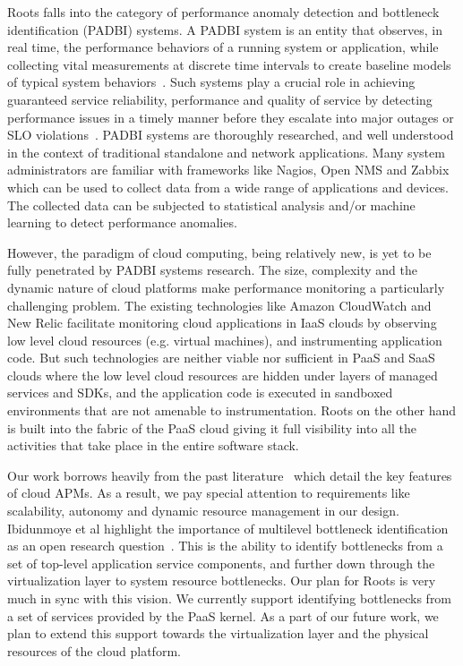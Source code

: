 Roots falls into the category of performance anomaly detection and bottleneck identification (PADBI) systems.
A PADBI system is an entity that observes, in real time, the performance behaviors
of a running system or application, while collecting vital measurements at discrete time intervals to create baseline
models of typical system behaviors~\cite{Ibidunmoye:2015:PAD:2808687.2791120}. 
Such systems play a crucial role in achieving guaranteed service reliability, performance and
quality of service by detecting performance issues in a timely manner before they escalate into major outages
or SLO violations~\cite{6045942}. 
PADBI systems are thoroughly researched, and well understood in the context of traditional standalone and
network applications. Many system administrators are familiar with frameworks like Nagios, Open NMS and Zabbix which
can be used to collect data from a wide range of applications and devices. The collected data can be
subjected to statistical analysis and/or machine learning to detect performance anomalies. 

However, the paradigm of cloud computing, being relatively new, is yet to be
fully penetrated by PADBI systems research. The size, complexity and the dynamic nature of 
cloud platforms make performance monitoring a particularly challenging problem.
The existing technologies like Amazon CloudWatch
and New Relic facilitate monitoring cloud applications in IaaS clouds by observing low level
cloud resources (e.g. virtual machines), and instrumenting application code. But such technologies
are neither viable nor sufficient in
PaaS and SaaS clouds where the low level cloud resources are hidden under layers of managed
services and SDKs, and the application code is executed in sandboxed environments that are not
amenable to instrumentation. Roots on the other hand is built into the 
fabric of the PaaS cloud giving it full visibility into all the activities that take place in the entire
software stack.

Our work borrows heavily from the past literature~\cite{DaCunhaRodrigues:2016:MCC:2851613.2851619,Ibidunmoye:2015:PAD:2808687.2791120} 
which detail the key features of cloud APMs. As a result, we pay special attention to requirements like
scalability, autonomy and dynamic resource management in our design.
Ibidunmoye et al highlight the importance of multilevel bottleneck identification as an open research
question~\cite{Ibidunmoye:2015:PAD:2808687.2791120}. This is the ability to
identify bottlenecks from a set of top-level application service components, and further down through the 
virtualization layer to system resource bottlenecks. Our plan for Roots is very much in sync with this
vision. We currently support identifying bottlenecks from a set of services provided by the PaaS kernel.
As a part of our future work, we plan to extend this support towards the virtualization layer and the
physical resources of the cloud platform.

